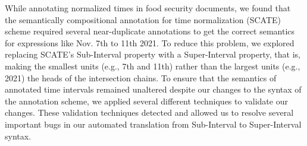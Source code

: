 While annotating normalized times in food security documents, we found that the semantically compositional annotation for time normalization (SCATE) scheme required several near-duplicate annotations to get the correct semantics for expressions like Nov. 7th to 11th 2021. To reduce this problem, we explored replacing SCATE's Sub-Interval property with a Super-Interval property, that is, making the smallest units (e.g., 7th and 11th) rather than the largest units (e.g., 2021) the heads of the intersection chains. To ensure that the semantics of annotated time intervals remained unaltered despite our changes to the syntax of the annotation scheme, we applied several different techniques to validate our changes. These validation techniques detected and allowed us to resolve several important bugs in our automated translation from Sub-Interval to Super-Interval syntax.
